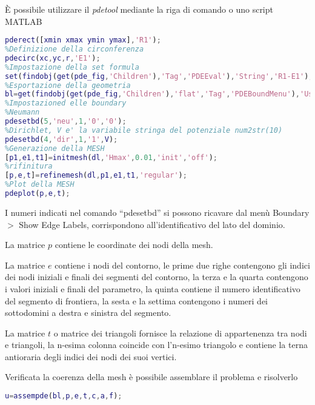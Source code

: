 È possibile utilizzare il \textit{pdetool} mediante la riga di comando
o uno script MATLAB
\begin{lstlisting}[style=Matlab-editor,language = Matlab]
%Definizione del rettangolo
pderect([xmin xmax ymin ymax],'R1');
%Definizione della circonferenza
pdecirc(xc,yc,r,'E1');
%Impostazione della set formula
set(findobj(get(pde_fig,'Children'),'Tag','PDEEval'),'String','R1-E1');
%Esportazione della geometria
bl=get(findobj(get(pde_fig,'Children'),'flat','Tag','PDEBoundMenu'),'UserData');
%Impostazioned elle boundary
%Neumann
pdesetbd(5,'neu',1,'0','0');
%Dirichlet, V e' la variabile stringa del potenziale num2str(10)
pdesetbd(4,'dir',1,'1',V);
%Generazione della MESH
[p1,e1,t1]=initmesh(dl,'Hmax',0.01,'init','off');
%rifinitura
[p,e,t]=refinemesh(dl,p1,e1,t1,'regular');
%Plot della MESH
pdeplot(p,e,t);
\end{lstlisting}
I numeri indicati nel comando ``pdesetbd'' si possono ricavare dal menù
Boundary $>$ Show Edge Labels, corrispondono all'identificativo del lato
del dominio.

La matrice $p$ contiene le coordinate dei nodi della mesh.

La matrice $e$
contiene i nodi del contorno, le prime due righe contengono gli indici
dei nodi iniziali e finali dei segmenti del contorno, la terza e la quarta
contengono i valori iniziali e finali del parametro, la quinta contiene
il numero identificativo del segmento di frontiera, la sesta e la settima
contengono i numeri dei sottodomini a destra e sinistra del segmento.

La matrice $t$ o matrice dei triangoli fornisce la relazione di appartenenza tra 
nodi e triangoli, la n-esima colonna coincide con l'n-esimo triangolo e contiene
la terna antioraria degli indici dei nodi dei suoi vertici.

Verificata la coerenza della mesh è possibile assemblare il problema e risolverlo
\begin{lstlisting}[style=Matlab-editor,language = Matlab]
u=assempde(bl,p,e,t,c,a,f);
\end{lstlisting}

